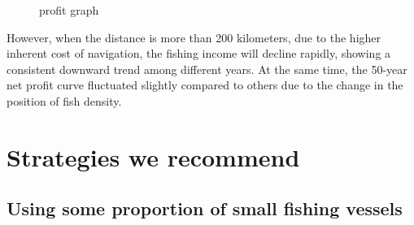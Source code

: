 \documentclass{mcmthesis}
\begin{document}
\begin{figure}[htbp]
  \centering
  \centering
  \caption{profit graph}
\end{figure}

However, when the distance is more than 200 kilometers, due to the higher inherent cost of navigation, the fishing income will decline rapidly, showing a consistent downward trend among different years. At the same time, the 50-year net profit  curve fluctuated slightly compared to others due to the change in the position of fish density.

\section{Strategies we recommend}
\subsection{Using some proportion of small fishing vessels}
\end{document}
